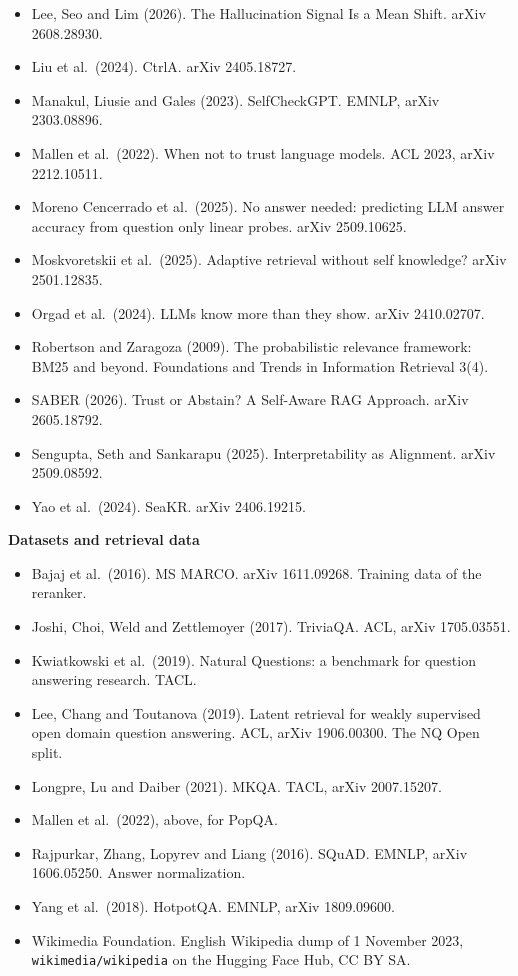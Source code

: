 \documentclass[11pt,a4paper]{article}
\begin{document}
\begin{itemize}
\item Lee, Seo and Lim (2026). The Hallucination Signal Is a Mean Shift. arXiv 2608.28930.
\item Liu et al.\ (2024). CtrlA. arXiv 2405.18727.
\item Manakul, Liusie and Gales (2023). SelfCheckGPT. EMNLP, arXiv 2303.08896.
\item Mallen et al.\ (2022). When not to trust language models. ACL 2023, arXiv 2212.10511.
\item Moreno Cencerrado et al.\ (2025). No answer needed: predicting LLM answer accuracy from question only linear probes. arXiv 2509.10625.
\item Moskvoretskii et al.\ (2025). Adaptive retrieval without self knowledge? arXiv 2501.12835.
\item Orgad et al.\ (2024). LLMs know more than they show. arXiv 2410.02707.
\item Robertson and Zaragoza (2009). The probabilistic relevance framework: BM25 and beyond. Foundations and Trends in Information Retrieval 3(4).
\item SABER (2026). Trust or Abstain? A Self-Aware RAG Approach. arXiv 2605.18792.
\item Sengupta, Seth and Sankarapu (2025). Interpretability as Alignment. arXiv 2509.08592.
\item Yao et al.\ (2024). SeaKR. arXiv 2406.19215.
\end{itemize}

\textbf{Datasets and retrieval data}
\begin{itemize}\setlength\itemsep{0.15em}
\item Bajaj et al.\ (2016). MS MARCO. arXiv 1611.09268. Training data of the reranker.
\item Joshi, Choi, Weld and Zettlemoyer (2017). TriviaQA. ACL, arXiv 1705.03551.
\item Kwiatkowski et al.\ (2019). Natural Questions: a benchmark for question answering research. TACL.
\item Lee, Chang and Toutanova (2019). Latent retrieval for weakly supervised open domain question answering. ACL, arXiv 1906.00300. The NQ Open split.
\item Longpre, Lu and Daiber (2021). MKQA. TACL, arXiv 2007.15207.
\item Mallen et al.\ (2022), above, for PopQA.
\item Rajpurkar, Zhang, Lopyrev and Liang (2016). SQuAD. EMNLP, arXiv 1606.05250. Answer normalization.
\item Yang et al.\ (2018). HotpotQA. EMNLP, arXiv 1809.09600.
\item Wikimedia Foundation. English Wikipedia dump of 1 November 2023, \nolinkurl{wikimedia/wikipedia} on the Hugging Face Hub, CC BY SA.
\end{itemize}
\end{document}

